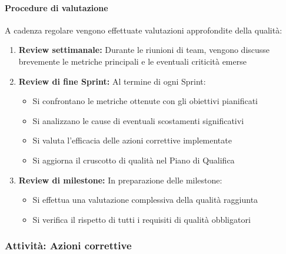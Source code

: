 \documentclass[a4paper,12pt]{article}
\begin{document}
\paragraph{Procedure di valutazione}
A cadenza regolare vengono effettuate valutazioni approfondite della qualità:
\begin{enumerate}
    \item \textbf{Review settimanale:} Durante le riunioni di team, vengono discusse brevemente le metriche principali e le eventuali criticità emerse
    \item \textbf{Review di fine Sprint:} Al termine di ogni Sprint:
    \begin{itemize}
        \item Si confrontano le metriche ottenute con gli obiettivi pianificati
        \item Si analizzano le cause di eventuali scostamenti significativi
        \item Si valuta l'efficacia delle azioni correttive implementate
        \item Si aggiorna il cruscotto di qualità nel Piano di Qualifica
    \end{itemize}
    \item \textbf{Review di milestone:} In preparazione delle milestone:
    \begin{itemize}
        \item Si effettua una valutazione complessiva della qualità raggiunta
        \item Si verifica il rispetto di tutti i requisiti di qualità obbligatori
    \end{itemize}
\end{enumerate}

\subsubsection{Attività: Azioni correttive}\label{azioni_correttive}
\end{document}
